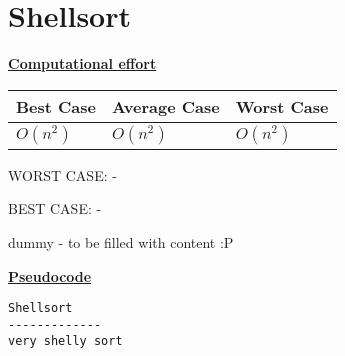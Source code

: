 \documentclass[a4paper]{report}
\begin{document}
\chapter*{Shellsort}

\underline{\bf{Computational effort}}

\begin{tabular}{|l|l|l|}
\hline
Best Case    & Average Case  &  Worst Case\\ \hline
$O(n^2)$ & $O(n^2)$  &  $O(n^2)$  \\ \hline
\end{tabular}

WORST CASE: - 


BEST CASE: -

dummy - to be filled with content :P

\underline{\bf{Pseudocode}}

\begin{lstlisting}
Shellsort
-------------
very shelly sort
\end{lstlisting}
\end{document}

